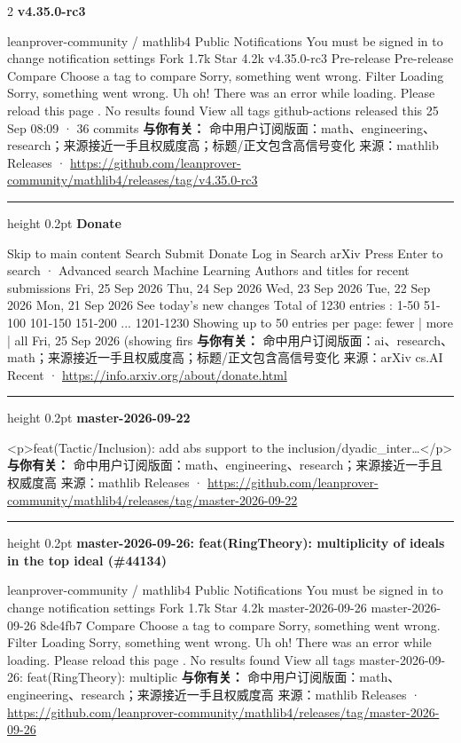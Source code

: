 \documentclass[10.5pt]{ctexart}
\begin{document}
\begin{multicols}{2}
{\large\bfseries v4.35.0-rc3}\par
leanprover-community / mathlib4 Public Notifications You must be signed in to change notification settings Fork 1.7k Star 4.2k v4.35.0-rc3 Pre-release Pre-release Compare Choose a tag to compare Sorry, something went wrong. Filter Loading Sorry, something went wrong. Uh oh! There was an error while loading. Please reload this page . No results found View all tags github-actions released this 25 Sep 08:09 · 36 commits
\textbf{与你有关：} 命中用户订阅版面：math、engineering、research；来源接近一手且权威度高；标题/正文包含高信号变化
{\footnotesize\color{ormuted} 来源：mathlib Releases · \url{https://github.com/leanprover-community/mathlib4/releases/tag/v4.35.0-rc3}}
\vspace{2mm}
\hrule height 0.2pt
\vspace{2mm}
{\large\bfseries Donate}\par
Skip to main content Search Submit Donate Log in Search arXiv Press Enter to search · Advanced search Machine Learning Authors and titles for recent submissions Fri, 25 Sep 2026 Thu, 24 Sep 2026 Wed, 23 Sep 2026 Tue, 22 Sep 2026 Mon, 21 Sep 2026 See today's new changes Total of 1230 entries : 1-50 51-100 101-150 151-200 ... 1201-1230 Showing up to 50 entries per page: fewer | more | all Fri, 25 Sep 2026 (showing firs
\textbf{与你有关：} 命中用户订阅版面：ai、research、math；来源接近一手且权威度高；标题/正文包含高信号变化
{\footnotesize\color{ormuted} 来源：arXiv cs.AI Recent · \url{https://info.arxiv.org/about/donate.html}}
\vspace{2mm}
\hrule height 0.2pt
\vspace{2mm}
{\large\bfseries master-2026-09-22}\par
<p>feat(Tactic/Inclusion): add abs support to the inclusion/dyadic\_inter…</p>
\textbf{与你有关：} 命中用户订阅版面：math、engineering、research；来源接近一手且权威度高
{\footnotesize\color{ormuted} 来源：mathlib Releases · \url{https://github.com/leanprover-community/mathlib4/releases/tag/master-2026-09-22}}
\vspace{2mm}
\hrule height 0.2pt
\vspace{2mm}
{\large\bfseries master-2026-09-26: feat(RingTheory): multiplicity of ideals in the top ideal (\#44134)}\par
leanprover-community / mathlib4 Public Notifications You must be signed in to change notification settings Fork 1.7k Star 4.2k master-2026-09-26 master-2026-09-26 8de4fb7 Compare Choose a tag to compare Sorry, something went wrong. Filter Loading Sorry, something went wrong. Uh oh! There was an error while loading. Please reload this page . No results found View all tags master-2026-09-26: feat(RingTheory): multiplic
\textbf{与你有关：} 命中用户订阅版面：math、engineering、research；来源接近一手且权威度高
{\footnotesize\color{ormuted} 来源：mathlib Releases · \url{https://github.com/leanprover-community/mathlib4/releases/tag/master-2026-09-26}}
\end{multicols}
\end{document}
